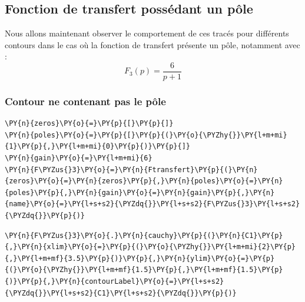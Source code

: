 \subsection{Fonction de transfert possédant un pôle}
Nous allons maintenant observer le comportement de ces tracés pour différents
contours dans le cas où la fonction de transfert présente un pôle,
notamment avec :
\[
F_3(p)=\dfrac{6}{p+1}
\] 
\subsubsection{Contour ne contenant pas le pôle}
\begin{tcolorbox}[breakable, size=fbox, boxrule=1pt, pad at break*=1mm,colback=cellbackground, colframe=cellborder]
\begin{Verbatim}[commandchars=\\\{\}]
\PY{n}{zeros}\PY{o}{=}\PY{p}{[}\PY{p}{]}
\PY{n}{poles}\PY{o}{=}\PY{p}{[}\PY{p}{(}\PY{o}{\PYZhy{}}\PY{l+m+mi}{1}\PY{p}{,}\PY{l+m+mi}{0}\PY{p}{)}\PY{p}{]}
\PY{n}{gain}\PY{o}{=}\PY{l+m+mi}{6}
\PY{n}{F\PYZus{}3}\PY{o}{=}\PY{n}{Ftransfert}\PY{p}{(}\PY{n}{zeros}\PY{o}{=}\PY{n}{zeros}\PY{p}{,}\PY{n}{poles}\PY{o}{=}\PY{n}{poles}\PY{p}{,}\PY{n}{gain}\PY{o}{=}\PY{n}{gain}\PY{p}{,}\PY{n}{name}\PY{o}{=}\PY{l+s+s2}{\PYZdq{}}\PY{l+s+s2}{F\PYZus{}3}\PY{l+s+s2}{\PYZdq{}}\PY{p}{)}
\end{Verbatim}
\end{tcolorbox}
\begin{tcolorbox}[breakable, size=fbox, boxrule=1pt, pad at break*=1mm,colback=cellbackground, colframe=cellborder]
\begin{Verbatim}[commandchars=\\\{\}]
\PY{n}{F\PYZus{}3}\PY{o}{.}\PY{n}{cauchy}\PY{p}{(}\PY{n}{C1}\PY{p}{,}\PY{n}{xlim}\PY{o}{=}\PY{p}{(}\PY{o}{\PYZhy{}}\PY{l+m+mi}{2}\PY{p}{,}\PY{l+m+mf}{3.5}\PY{p}{)}\PY{p}{,}\PY{n}{ylim}\PY{o}{=}\PY{p}{(}\PY{o}{\PYZhy{}}\PY{l+m+mf}{1.5}\PY{p}{,}\PY{l+m+mf}{1.5}\PY{p}{)}\PY{p}{,}\PY{n}{contourLabel}\PY{o}{=}\PY{l+s+s2}{\PYZdq{}}\PY{l+s+s2}{C1}\PY{l+s+s2}{\PYZdq{}}\PY{p}{)}
\end{Verbatim}
\end{tcolorbox}
